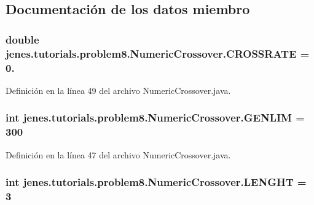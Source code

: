 \subsection{Documentación de los datos miembro}
\hypertarget{classjenes_1_1tutorials_1_1problem8_1_1_numeric_crossover_ae4fcf3a595e386c6aeec443dedaba83f}{
\subsubsection[{C\-R\-O\-S\-S\-R\-A\-T\-E}]{\setlength{\rightskip}{0pt plus 5cm}double jenes.\-tutorials.\-problem8.\-Numeric\-Crossover.\-C\-R\-O\-S\-S\-R\-A\-T\-E = 0.\hspace{0.3cm}{\ttfamily [static]}}}\label{classjenes_1_1tutorials_1_1problem8_1_1_numeric_crossover_ae4fcf3a595e386c6aeec443dedaba83f}


Definición en la línea 49 del archivo Numeric\-Crossover.\-java.

\hypertarget{classjenes_1_1tutorials_1_1problem8_1_1_numeric_crossover_a5e45487dcf5730d7c628ca85b21160dc}{
\subsubsection[{G\-E\-N\-L\-I\-M}]{\setlength{\rightskip}{0pt plus 5cm}int jenes.\-tutorials.\-problem8.\-Numeric\-Crossover.\-G\-E\-N\-L\-I\-M = 300\hspace{0.3cm}{\ttfamily [static]}}}\label{classjenes_1_1tutorials_1_1problem8_1_1_numeric_crossover_a5e45487dcf5730d7c628ca85b21160dc}


Definición en la línea 47 del archivo Numeric\-Crossover.\-java.

\hypertarget{classjenes_1_1tutorials_1_1problem8_1_1_numeric_crossover_af73d636c488b92bf3ae33d19d1f5f5e7}{
\subsubsection[{L\-E\-N\-G\-H\-T}]{\setlength{\rightskip}{0pt plus 5cm}int jenes.\-tutorials.\-problem8.\-Numeric\-Crossover.\-L\-E\-N\-G\-H\-T = 3\hspace{0.3cm}{\ttfamily [static]}}}\label{classjenes_1_1tutorials_1_1problem8_1_1_numeric_crossover_af73d636c488b92bf3ae33d19d1f5f5e7}


